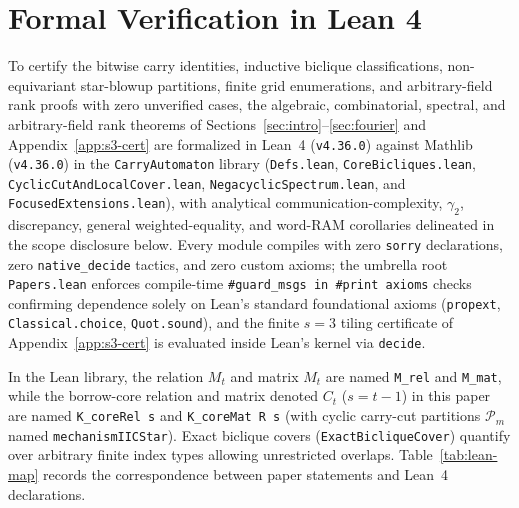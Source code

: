 \documentclass[11pt,reqno]{amsart}
\theoremstyle{definition}
\theoremstyle{remark}
\numberwithin{equation}{section}
\begin{document}
\section{Formal Verification in Lean 4}
\label{sec:lean}

To certify the bitwise carry identities, inductive biclique classifications, non-equivariant star-blowup partitions, finite grid enumerations, and arbitrary-field rank proofs with zero unverified cases, the algebraic, combinatorial, spectral, and arbitrary-field rank theorems of Sections~\ref{sec:intro}--\ref{sec:fourier} and Appendix~\ref{app:s3-cert} are formalized in Lean~4 (\texttt{v4.36.0}) against Mathlib (\texttt{v4.36.0}) in the \texttt{CarryAutomaton} library (\texttt{Defs.lean}, \texttt{CoreBicliques.lean}, \texttt{CyclicCutAndLocalCover.lean}, \texttt{NegacyclicSpectrum.lean}, and \texttt{FocusedExtensions.lean}), with analytical communication-complexity, $\gamma_2$, discrepancy, general weighted-equality, and word-RAM corollaries delineated in the scope disclosure below. Every module compiles with zero \texttt{sorry} declarations, zero \texttt{native\_decide} tactics, and zero custom axioms; the umbrella root \texttt{Papers.lean} enforces compile-time \texttt{\#guard\_msgs in \#print axioms} checks confirming dependence solely on Lean's standard foundational axioms (\texttt{propext}, \texttt{Classical.choice}, \texttt{Quot.sound}), and the finite $s = 3$ tiling certificate of Appendix~\ref{app:s3-cert} is evaluated inside Lean's kernel via \texttt{decide}.

In the Lean library, the relation $M_t$ and matrix $M_t$ are named \texttt{M\_rel} and \texttt{M\_mat}, while the borrow-core relation and matrix denoted $C_t$ ($s = t - 1$) in this paper are named \texttt{K\_coreRel s} and \texttt{K\_coreMat R s} (with cyclic carry-cut partitions $\mathcal{P}_m$ named \texttt{mechanismIICStar}). Exact biclique covers (\texttt{ExactBicliqueCover}) quantify over arbitrary finite index types allowing unrestricted overlaps. Table~\ref{tab:lean-map} records the correspondence between paper statements and Lean~4 declarations.
\end{document}
